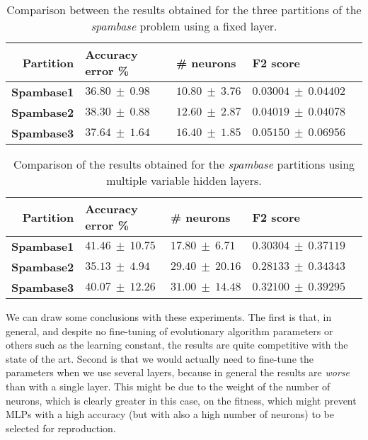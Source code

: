 \documentclass[runningheads]{llncs}
\begin{document}
\begin{table}
    \centering
    \caption{
        Comparison between the results obtained for the three partitions of the
        \emph{spambase} problem using a fixed layer. %
    }
    \label{tab:spambase-onelayer}
    \begin{tabular}{r|l|l|l|l}
        \textbf{Partition} & \textbf{Accuracy error \%} & \textbf{\# neurons} & \textbf{F2 score} \\
        \hline
        \textbf{Spambase1}   & $36.80\ \pm\ 0.98$ & $10.80\ \pm\ 3.76$ & $0.03004\ \pm\ 0.04402$ \\
        \textbf{Spambase2}   & $38.30\ \pm\ 0.88$ & $12.60\ \pm\ 2.87$ & $0.04019\ \pm\ 0.04078$ \\
        \textbf{Spambase3}   & $37.64\ \pm\ 1.64$ & $16.40\ \pm\ 1.85$ & $0.05150\ \pm\ 0.06956$ \\
    \end{tabular}
\end{table}

\begin{table}
    \centering
    \caption{
        Comparison of the results obtained for the \emph{spambase} partitions
        using multiple variable hidden layers.
    }
    \label{tab:spambase-2layer}
    \begin{tabular}{r|l|l|l|l}
        \textbf{Partition} & \textbf{Accuracy error \%} & \textbf{\# neurons} & \textbf{F2 score} \\
        \hline
        \textbf{Spambase1}   & $41.46\ \pm\ 10.75$ & $17.80\ \pm\ 6.71$ & $0.30304\ \pm\ 0.37119$ \\
        \textbf{Spambase2}   & $35.13\ \pm\ 4.94$ & $29.40\ \pm\ 20.16$ & $0.28133\ \pm\ 0.34343$ \\
        \textbf{Spambase3}   & $40.07\ \pm\ 12.26$ & $31.00\ \pm\ 14.48$ & $0.32100\ \pm\ 0.39295$ \\
    \end{tabular}
\end{table}

We can draw some conclusions with these experiments. The first is
that, in general, and despite no fine-tuning of evolutionary algorithm
parameters or others such as the learning constant, the results are
quite competitive with the state of the art. Second is that we would
actually need to fine-tune the parameters when we use several layers,
because in general the results are {\em worse} than with a single
layer. This might be due to the weight of the number of neurons, which
is clearly greater in this case, on the fitness, which might prevent
MLPs with a high accuracy (but with also a high number of neurons) to
be selected for reproduction.
\end{document}
